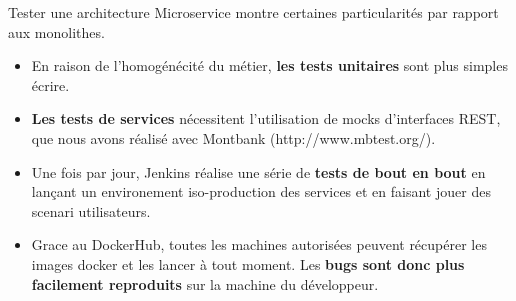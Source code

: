 \documentclass[portrait,final,a0paper]{baposter}
\begin{document}
\begin{poster}
{\begin{multicols}{2}
Tester une architecture Microservice montre certaines particularités par rapport aux monolithes.
\begin{itemize}
	\item En raison de l'homogénécité du métier, \textbf{les tests unitaires} sont plus simples écrire. 
	\item  \textbf{Les tests de services} nécessitent l'utilisation de mocks d'interfaces REST, que nous avons réalisé avec Montbank (http://www.mbtest.org/).
	\item Une fois par jour, Jenkins réalise une série de \textbf{tests de bout en bout} en lançant un environement iso-production des services et en faisant jouer des scenari utilisateurs.
	\item Grace au DockerHub, toutes les machines autorisées peuvent récupérer les images docker et les lancer à tout moment. Les \textbf{bugs sont donc plus facilement reproduits} sur la machine du développeur.
\end{itemize}


					
	\end{multicols}
  

 }
 
 




\end{poster}
\end{document}
